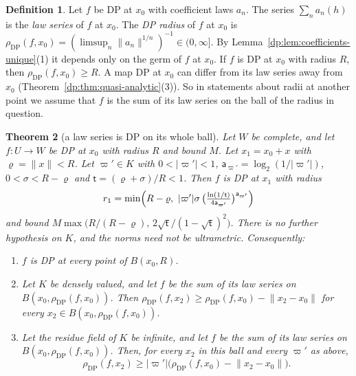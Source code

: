 \documentclass[11pt]{amsart}
\newtheorem{theorem}{Theorem}[section]
\theoremstyle{definition}
\newtheorem{definition}[theorem]{Definition}
\theoremstyle{remark}
\numberwithin{equation}{section}
\newcommand{\abs}[1]{\lvert #1\rvert}
\newcommand{\norm}[1]{\lVert #1\rVert}
\theoremstyle{plain}
\theoremstyle{definition}
\theoremstyle{plain}
\begin{document}
\begin{definition}\label{dp:def:radius}
Let $f$ be DP at $x_0$ with coefficient laws $a_n$. The series $\sum_na_n(h)$ is the \emph{law series} of $f$ at $x_0$. The \emph{DP radius} of $f$ at $x_0$ is $\rho_{\mathrm{DP}}(f,x_0)=(\limsup_n\norm{a_n}^{1/n})^{-1}\in(0,\infty]$. By Lemma~\ref{dp:lem:coefficients-unique}(1) it depends only on the germ of $f$ at $x_0$. If $f$ is DP at $x_0$ with radius $R$, then $\rho_{\mathrm{DP}}(f,x_0)\ge R$. A map DP at $x_0$ can differ from its law series away from $x_0$ (Theorem~\ref{dp:thm:quasi-analytic}(3)). So in statements about radii at another point we assume that $f$ is the sum of its law series on the ball of the radius in question.
\end{definition}

\begin{theorem}[a law series is DP on its whole ball]\label{dp:thm:whole-ball}
Let $W$ be complete, and let $f\colon U\to W$ be DP at $x_0$ with radius $R$ and bound $M$. Let $x_1=x_0+x$ with $\varrho=\norm x<R$. Let $\varpi'\in K$ with $0<\abs{\varpi'}<1$, $\mathsf a_{\varpi'}=\log_2(1/\abs{\varpi'})$, $0<\sigma<R-\varrho$ and $\mathsf t=(\varrho+\sigma)/R<1$. Then $f$ is DP at $x_1$ with radius
\begin{equation}\label{dp:4a:eq:radius}
 r_1=\min\Bigl(R-\varrho,\ \abs{\varpi'}\sigma\,\bigl(\tfrac{\ln(1/\mathsf t)}{4\mathsf a_{\varpi'}}\bigr)^{\mathsf a_{\varpi'}}\Bigr)
\end{equation}
and bound $M\max\bigl(R/(R-\varrho),\,2\sqrt{\mathsf t}/(1-\sqrt{\mathsf t})^2\bigr)$. There is no further hypothesis on $K$, and the norms need not be ultrametric. Consequently:
\begin{enumerate}
\item $f$ is DP at every point of $B(x_0,R)$.
\item Let $K$ be densely valued, and let $f$ be the sum of its law series on $B(x_0,\rho_{\mathrm{DP}}(f,x_0))$. Then $\rho_{\mathrm{DP}}(f,x_2)\ge\rho_{\mathrm{DP}}(f,x_0)-\norm{x_2-x_0}$ for every $x_2\in B(x_0,\rho_{\mathrm{DP}}(f,x_0))$.
\item Let the residue field of $K$ be infinite, and let $f$ be the sum of its law series on $B(x_0,\rho_{\mathrm{DP}}(f,x_0))$. Then, for every $x_2$ in this ball and every $\varpi'$ as above,
\[
 \rho_{\mathrm{DP}}(f,x_2)\ge\abs{\varpi'}\bigl(\rho_{\mathrm{DP}}(f,x_0)-\norm{x_2-x_0}\bigr).
\]
\end{enumerate}
\end{theorem}
\end{document}
